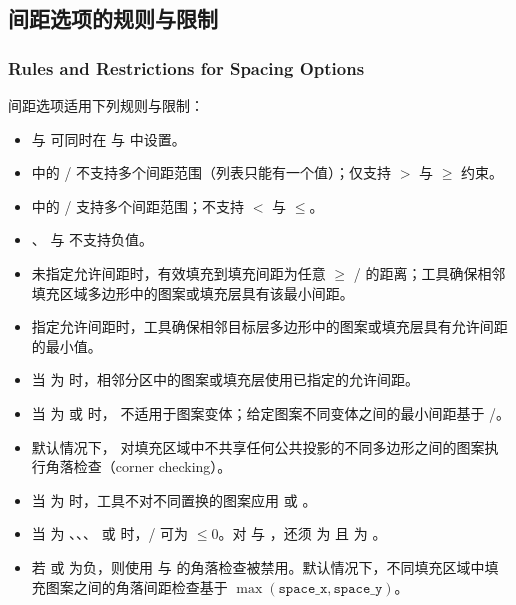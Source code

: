 \subsection{间距选项的规则与限制}
\subsubsection*{Rules and Restrictions for Spacing Options}

间距选项适用下列规则与限制：
\begin{itemize}
  \item {} 与  可同时在  与  中设置。
  \item {} 中的 / 不支持多个间距范围（列表只能有一个值）；仅支持 $>$ 与 $\geq$ 约束。
  \item {} 中的 / 支持多个间距范围；不支持 $<$ 与 $\leq$。
  \item {}、 与  不支持负值。
  \item 未指定允许间距时，有效填充到填充间距为任意 $\geq$ / 的距离；工具确保相邻填充区域多边形中的图案或填充层具有该最小间距。
  \item 指定允许间距时，工具确保相邻目标层多边形中的图案或填充层具有允许间距的最小值。
  \item 当  为  时，相邻分区中的图案或填充层使用已指定的允许间距。
  \item 当  为  或  时， 不适用于图案变体；给定图案不同变体之间的最小间距基于 /。
  \item 默认情况下， 对填充区域中不共享任何公共投影的不同多边形之间的图案执行角落检查（corner checking）。
  \item 当  为  时，工具不对不同置换的图案应用  或 。
  \item 当  为 、、、 或  时，/ 可为 $\leq 0$。对  与 ，还须  为  且  为 。
  \item 若  或  为负，则使用  与  的角落检查被禁用。默认情况下，不同填充区域中填充图案之间的角落间距检查基于 $\max(\texttt{space\_x},\texttt{space\_y})$。
\end{itemize}

